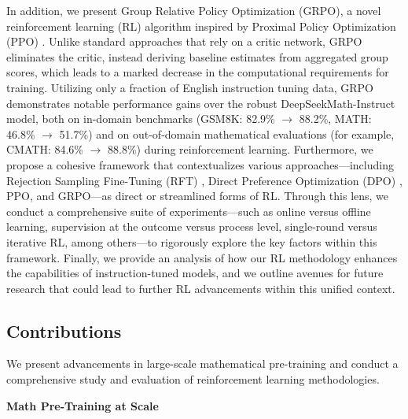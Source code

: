 In addition, we present Group Relative Policy Optimization (GRPO), a novel reinforcement learning (RL) algorithm inspired by Proximal Policy Optimization (PPO) \citep{schulman2017proximal}. Unlike standard approaches that rely on a critic network, GRPO eliminates the critic, instead deriving baseline estimates from aggregated group scores, which leads to a marked decrease in the computational requirements for training. Utilizing only a fraction of English instruction tuning data, GRPO demonstrates notable performance gains over the robust DeepSeekMath-Instruct model, both on in-domain benchmarks (GSM8K: 82.9\% $\rightarrow$ 88.2\%, MATH: 46.8\% $\rightarrow$ 51.7\%) and on out-of-domain mathematical evaluations (for example, CMATH: 84.6\% $\rightarrow$ 88.8\%) during reinforcement learning. Furthermore, we propose a cohesive framework that contextualizes various approaches—including Rejection Sampling Fine-Tuning (RFT) \citep{yuan2023scaling}, Direct Preference Optimization (DPO) \citep{dpo}, PPO, and GRPO—as direct or streamlined forms of RL. Through this lens, we conduct a comprehensive suite of experiments—such as online versus offline learning, supervision at the outcome versus process level, single-round versus iterative RL, among others—to rigorously explore the key factors within this framework. Finally, we provide an analysis of how our RL methodology enhances the capabilities of instruction-tuned models, and we outline avenues for future research that could lead to further RL advancements within this unified context.

\subsection{Contributions}
We present advancements in large-scale mathematical pre-training and conduct a comprehensive study and evaluation of reinforcement learning methodologies.

\textbf{Math Pre-Training at Scale}

